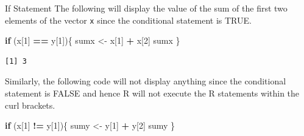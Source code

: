 \documentclass[
  ignorenonframetext,
]{beamer}
\newenvironment{Shaded}{\begin{snugshade}}{\end{snugshade}}
\newcommand{\ControlFlowTok}[1]{\textcolor[rgb]{0.13,0.29,0.53}{\textbf{#1}}}
\newcommand{\DecValTok}[1]{\textcolor[rgb]{0.00,0.00,0.81}{#1}}
\newcommand{\NormalTok}[1]{#1}
\newcommand{\OtherTok}[1]{\textcolor[rgb]{0.56,0.35,0.01}{#1}}
\newcommand{\SpecialCharTok}[1]{\textcolor[rgb]{0.81,0.36,0.00}{\textbf{#1}}}
\begin{document}
\begin{frame}[fragile]{If Statement}
\label{if-statement}
The following will display the value of the sum of the first two
elements of the vector \texttt{x} since the conditional statement is
TRUE.

\small

\begin{Shaded}
\begin{Highlighting}[]
\ControlFlowTok{if}\NormalTok{ (x[}\DecValTok{1}\NormalTok{] }\SpecialCharTok{==}\NormalTok{ y[}\DecValTok{1}\NormalTok{])\{}
\NormalTok{  sumx }\OtherTok{\textless{}{-}}\NormalTok{ x[}\DecValTok{1}\NormalTok{] }\SpecialCharTok{+}\NormalTok{ x[}\DecValTok{2}\NormalTok{]}
\NormalTok{  sumx}
\NormalTok{\}}
\end{Highlighting}
\end{Shaded}

\begin{verbatim}
[1] 3
\end{verbatim}

\normalsize

Similarly, the following code will not display anything since the
conditional statement is FALSE and hence R will not execute the R
statements within the curl brackets.

\small

\begin{Shaded}
\begin{Highlighting}[]
\ControlFlowTok{if}\NormalTok{ (x[}\DecValTok{1}\NormalTok{] }\SpecialCharTok{!=}\NormalTok{ y[}\DecValTok{1}\NormalTok{])\{}
\NormalTok{  sumy }\OtherTok{\textless{}{-}}\NormalTok{ y[}\DecValTok{1}\NormalTok{] }\SpecialCharTok{+}\NormalTok{ y[}\DecValTok{2}\NormalTok{]}
\NormalTok{  sumy}
\NormalTok{\}}
\end{Highlighting}
\end{Shaded}

\normalsize
\end{frame}
\end{document}

